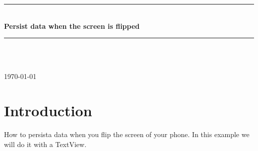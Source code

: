 \documentclass[12pt]{article} %
\begin{document}

\begin{titlepage}

\newcommand{\HRule}{\rule{\linewidth}{0.5mm}} %

\center %

\HRule \\[0.4cm]
{ \huge \bfseries Persist data when the screen is flipped}\\[0.4cm] %
\HRule \\[1.5cm]

\begin{minipage}{0.4\textwidth}
\end{minipage}\\[4cm]

{\large \today}\\[3cm] %


\vfill %

\end{titlepage}


\tableofcontents %

\newpage %


\section{Introduction} %

How to persista data when you flip the screen of your phone. In this example we will do it with a TextView.
\end{document}

